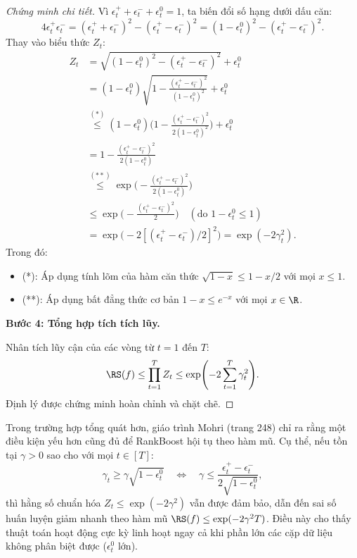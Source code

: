 \begin{proof}[Chứng minh chi tiết]
Vì $\epsilon^+_t + \epsilon^-_t + \epsilon^0_t = 1$, ta biến đổi số hạng dưới dấu căn:
\[
    4\epsilon^+_t \epsilon^-_t = (\epsilon^+_t + \epsilon^-_t)^2 - (\epsilon^+_t - \epsilon^-_t)^2
    = (1 - \epsilon^0_t)^2 - (\epsilon^+_t - \epsilon^-_t)^2.
\]
Thay vào biểu thức $Z_t$:
\begin{align*}
    Z_t &= \sqrt{(1 - \epsilon^0_t)^2 - (\epsilon^+_t - \epsilon^-_t)^2} + \epsilon^0_t \\
    &= (1 - \epsilon^0_t)\sqrt{1 - \frac{(\epsilon^+_t - \epsilon^-_t)^2}{(1 - \epsilon^0_t)^2}} + \epsilon^0_t \\
    &\stackrel{(*)}{\leq} (1 - \epsilon^0_t)\biggl(1 - \frac{(\epsilon^+_t - \epsilon^-_t)^2}{2(1 - \epsilon^0_t)^2}\biggr) + \epsilon^0_t \\
    &= 1 - \frac{(\epsilon^+_t - \epsilon^-_t)^2}{2(1 - \epsilon^0_t)} \\
    &\stackrel{(**)}{\leq} \exp\biggl(-\frac{(\epsilon^+_t - \epsilon^-_t)^2}{2(1 - \epsilon^0_t)}\biggr) \\
    &\leq \exp\biggl(-\frac{(\epsilon^+_t - \epsilon^-_t)^2}{2}\biggr) \quad (\text{do } 1 - \epsilon^0_t \leq 1) \\
    &= \exp\bigl(-2[(\epsilon^+_t - \epsilon^-_t)/2]^2\bigr) = \exp(-2\gamma_t^2).
\end{align*}
Trong đó:
\begin{itemize}
    \item (*): Áp dụng tính lõm của hàm căn thức $\sqrt{1 - x} \leq 1 - x/2$ với mọi $x \le 1$.
    \item (**): Áp dụng bất đẳng thức cơ bản $1 - x \leq e^{-x}$ với mọi $x \in \R$.
\end{itemize}

\textbf{Bước 4: Tổng hợp tích tích lũy.}

Nhân tích lũy cận của các vòng từ $t = 1$ đến $T$:
\[
    \RS(f) \leq \prod_{t=1}^T Z_t \leq \exp\Biggl(-2 \sum_{t=1}^T \gamma_t^2\Biggr).
\]
Định lý được chứng minh hoàn chỉnh và chặt chẽ.
\end{proof}

\begin{tcolorbox}[colback=yellow!5, colframe=orange!70!black, title={\textbf{Cận hội tụ dưới điều kiện yếu hơn (Weaker Edge Condition)}}]
Trong trường hợp tổng quát hơn, giáo trình Mohri (trang 248) chỉ ra rằng một điều kiện yếu hơn cũng đủ để RankBoost hội tụ theo hàm mũ. Cụ thể, nếu tồn tại $\gamma > 0$ sao cho với mọi $t \in [T]$:
\begin{equation}
    \gamma_t \geq \gamma \sqrt{1 - \epsilon^0_t} \quad \Longleftrightarrow \quad \gamma \leq \frac{\epsilon^+_t - \epsilon^-_t}{2\sqrt{1 - \epsilon^0_t}},
    \label{eq:weaker_edge}
\end{equation}
thì hằng số chuẩn hóa $Z_t \leq \exp(-2\gamma^2)$ vẫn được đảm bảo, dẫn đến sai số huấn luyện giảm nhanh theo hàm mũ $\RS(f) \leq \exp(-2\gamma^2 T)$. Điều này cho thấy thuật toán hoạt động cực kỳ linh hoạt ngay cả khi phần lớn các cặp dữ liệu không phân biệt được ($\epsilon^0_t$ lớn).
\end{tcolorbox}

